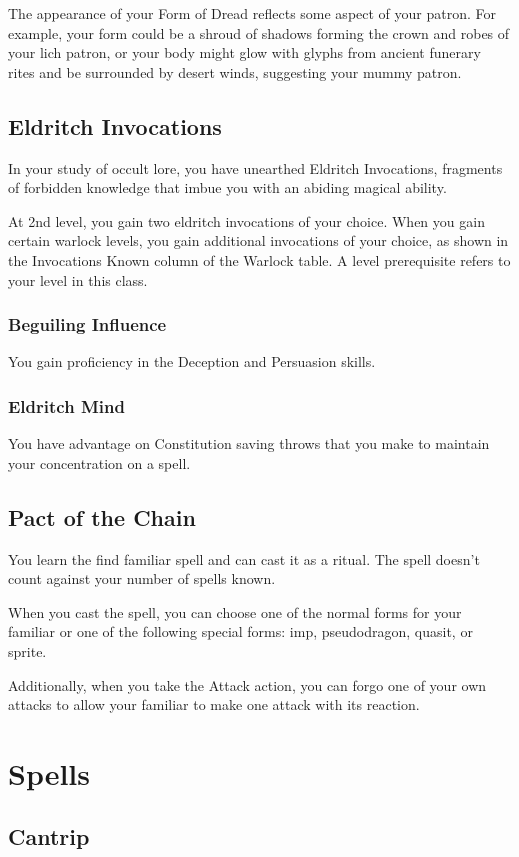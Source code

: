 \documentclass[letterpaper,openany,oneside,twocolumn]{book}
\begin{document}
The appearance of your Form of Dread reflects some aspect of your patron. For example, your form could be a shroud of shadows forming the crown and robes of your lich patron, or your body might glow with glyphs from ancient funerary rites and be surrounded by desert winds, suggesting your mummy patron.
\subsection*{Eldritch Invocations}
In your study of occult lore, you have unearthed Eldritch Invocations, fragments of forbidden knowledge that imbue you with an abiding magical ability.

At 2nd level, you gain two eldritch invocations of your choice. When you gain certain warlock levels, you gain additional invocations of your choice, as shown in the Invocations Known column of the Warlock table. A level prerequisite refers to your level in this class.
\subsubsection*{Beguiling Influence}
You gain proficiency in the Deception and Persuasion skills.
\subsubsection*{Eldritch Mind}
You have advantage on Constitution saving throws that you make to maintain your concentration on a spell.
\subsection*{Pact of the Chain}
You learn the find familiar spell and can cast it as a ritual. The spell doesn't count against your number of spells known.

When you cast the spell, you can choose one of the normal forms for your familiar or one of the following special forms: imp, pseudodragon, quasit, or sprite.

Additionally, when you take the Attack action, you can forgo one of your own attacks to allow your familiar to make one attack with its reaction.

\section*{Spells}
\subsection*{Cantrip}
\end{document}
